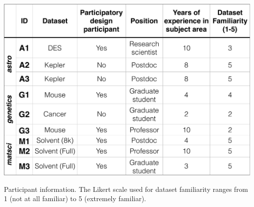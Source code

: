 \begin{table}[h]
\centering
\vspace{-10pt}
\includegraphics[width=\linewidth]{figures/participants.pdf}
\caption{Participant information. The Likert scale used for dataset familiarity ranges from 1 (not at all familiar) to 5 (extremely familiar).}
\label{participants}
\vspace{-10pt}
\end{table}
